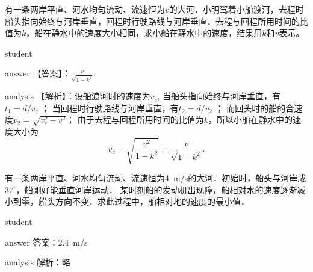 \begin{example}
	 有一条两岸平直、河水均匀流动、流速恒为$ v $的大河．小明驾着小船渡河，去程时船头指向始终与河岸垂直，回程时行驶路线与河岸垂直．去程与回程所用时间的比值为$ k $，船在静水中的速度大小相同，求小船在静水中的速度，结果用$ k $和$ v $表示。
	
	\begin{taggedblock}{student}
		\vspace*{3cm}
	\end{taggedblock}
	
	\begin{taggedblock}{answer}
		【答案】：$ \frac{v}{\sqrt{1-k^2}} $
	\end{taggedblock}
	
	\begin{taggedblock}{analysis}
		【解析】：设船渡河时的速度为$ v_c $,
		当船头指向始终与河岸垂直，有$ t_1 =d/v_c $ ；
		当回程时行驶路线与河岸垂直，有$ t_2 =d/v_2 $ ；
		而回头时的船的合速度$ v_2 =\sqrt{v_c^2-v^2  }$；
		由于去程与回程所用时间的比值为$ k $，所以小船在静水中的速度大小为
	\[
	v_c = \sqrt{\frac{v^2}{1-k^2}} = \frac{v}{\sqrt{1-k^2}}.
	\]
		
	\end{taggedblock}
\end{example}



\begin{example}
	有一条两岸平直、河水均匀流动、流速恒为\SI{4}{m/s}的大河．初始时，船头与河岸成$ 37^\circ $，船刚好能垂直河岸运动．
	某时刻船的发动机出现障，船相对水的速度逐渐减小到零，船头方向不变．求此过程中，船相对地的速度的最小值．
		\begin{taggedblock}{student}
		\vspace*{3cm}
	\end{taggedblock}

	\begin{taggedblock}{answer}
		答案：\SI{2.4}{m/s}
	\end{taggedblock}
	
	\begin{taggedblock}{analysis}
		解析：略
	\end{taggedblock}
\end{example}


